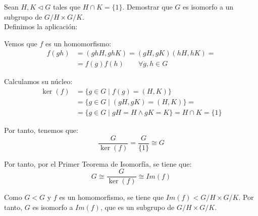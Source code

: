 \begin{ejercicio}
    Sean $H,K\lhd G$ tales que $H\cap K=\{1\}$. Demostrar que $G$ es isomorfo a un subgrupo de $G/H\times G/K$.\\

    Definimos la aplicación:

    Vemos que $f$ es un homomorfismo:
    \begin{align*}
        f(gh) &= (ghH,ghK) = (gH,gK)(hH,hK) =\\&= f(g)f(h)\qquad \forall g,h\in G
    \end{align*}

    Calculamos su núcleo:
    \begin{align*}
        \ker(f) &= \{g\in G\mid f(g)=(H,K)\}\\
        &= \{g\in G\mid (gH,gK)=(H,K)\} =\\&= \{g\in G\mid gH=H\wedge gK=K\} = H\cap K = \{1\}
    \end{align*}

    Por tanto, tenemos que:
    \begin{equation*}
        \dfrac{G}{\ker(f)}=\dfrac{G}{\{1\}} \cong G
    \end{equation*}

    Por tanto, por el Primer Teorema de Isomorfía, se tiene que:
    \begin{equation*}
        G\cong \dfrac{G}{\ker(f)}\cong Im(f)
    \end{equation*}

    Como $G<G$ y $f$ es un homomorfismo, se tiene que $Im(f)<G/H\times G/K$. Por tanto, $G$ es isomorfo a $Im(f)$, que es un subgrupo de $G/H\times G/K$.
\end{ejercicio}

